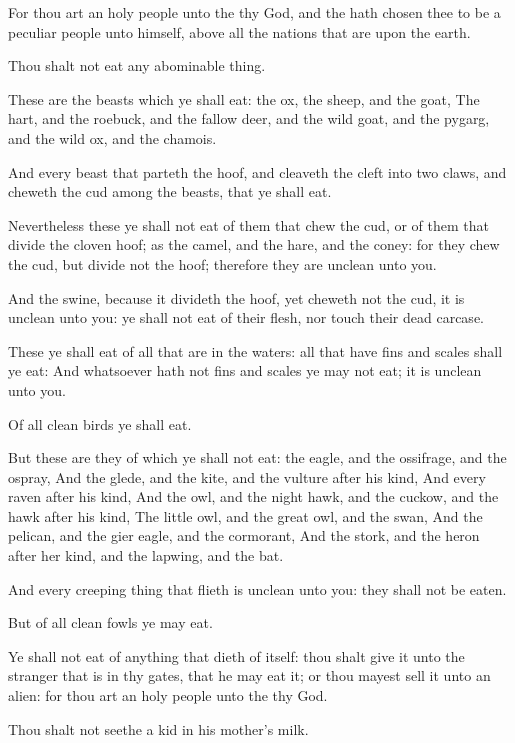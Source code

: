 \verse For thou art an holy people unto the \LORD thy God, and the \LORD hath chosen thee to be a peculiar people unto himself, above all the nations that are upon the earth.

\verse Thou shalt not eat any abominable thing.

\verse These are the beasts which ye shall eat: the ox, the sheep, and the goat, \verse The hart, and the roebuck, and the fallow deer, and the wild goat, and the pygarg, and the wild ox, and the chamois.

\verse And every beast that parteth the hoof, and cleaveth the cleft into two claws, and cheweth the cud among the beasts, that ye shall eat.

\verse Nevertheless these ye shall not eat of them that chew the cud, or of them that divide the cloven hoof; as the camel, and the hare, and the coney: for they chew the cud, but divide not the hoof; therefore they are unclean unto you.

\verse And the swine, because it divideth the hoof, yet cheweth not the cud, it is unclean unto you: ye shall not eat of their flesh, nor touch their dead carcase.

\verse These ye shall eat of all that are in the waters: all that have fins and scales shall ye eat: \verse And whatsoever hath not fins and scales ye may not eat; it is unclean unto you.

\verse Of all clean birds ye shall eat.

\verse But these are they of which ye shall not eat: the eagle, and the ossifrage, and the ospray, \verse And the glede, and the kite, and the vulture after his kind, \verse And every raven after his kind, \verse And the owl, and the night hawk, and the cuckow, and the hawk after his kind, \verse The little owl, and the great owl, and the swan, \verse And the pelican, and the gier eagle, and the cormorant, \verse And the stork, and the heron after her kind, and the lapwing, and the bat.

\verse And every creeping thing that flieth is unclean unto you: they shall not be eaten.

\verse But of all clean fowls ye may eat.

\verse Ye shall not eat of anything that dieth of itself: thou shalt give it unto the stranger that is in thy gates, that he may eat it; or thou mayest sell it unto an alien: for thou art an holy people unto the \LORD thy God.

Thou shalt not seethe a kid in his mother's milk.

